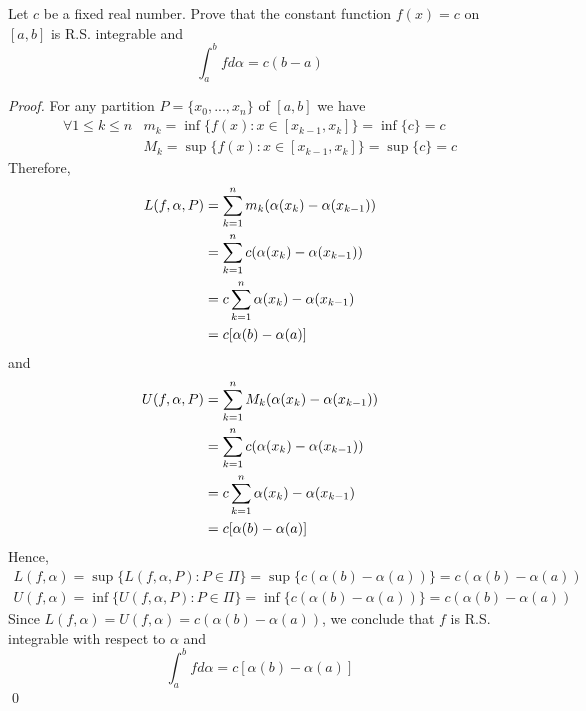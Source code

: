 \begin{example}
    Let $c$ be a fixed real number. Prove that the constant function $f(x) = c$ on $[a,b]$ is R.S. integrable and
    $$
    \int_{a}^{b}f d\alpha = c (b-a)
    $$
\end{example}
\begin{proof}
    For any partition $P = \{x_0, ..., x_n\}$ of $[a,b]$ we have
    \begin{align*}
        \forall 1 \leq k \leq n &m_k = \inf\{f(x) : x \in [x_{k-1}, x_k]\} = \inf \{c\} = c \\
        &M_k = \sup\{f(x) : x \in [x_{k-1}, x_k]\} = \sup \{c\} = c
    \end{align*}
    Therefore,
    \begin{align*}
        L(f, \alpha, P) &= \sum_{k=1}^{n}m_k (\alpha(x_{k})-\alpha(x_{k-1})) \\
        &= \sum_{k=1}^{n}c (\alpha(x_{k})-\alpha(x_{k-1})) \\
        &= c \sum_{k=1}^{n} \alpha(x_{k})-\alpha(x_{k-1}) \\
        &= c [\alpha(b) - \alpha(a)]
    \end{align*}
    and
    \begin{align*}
        U(f, \alpha, P) &= \sum_{k=1}^{n}M_k (\alpha(x_{k})-\alpha(x_{k-1})) \\
        &= \sum_{k=1}^{n}c (\alpha(x_{k})-\alpha(x_{k-1})) \\
        &= c \sum_{k=1}^{n} \alpha(x_{k})-\alpha(x_{k-1}) \\
        &= c [\alpha(b) - \alpha(a)]
    \end{align*}
    Hence,
    \begin{align*}
        L(f, \alpha) = \sup \{L(f, \alpha, P) : P \in \Pi\} = \sup \{c (\alpha(b) - \alpha(a))\} = c(\alpha(b) - \alpha(a)) \\
        U(f, \alpha) = \inf \{U(f, \alpha, P) : P \in \Pi\} = \inf \{c(\alpha(b) - \alpha(a))\} = c(\alpha(b) - \alpha(a))
    \end{align*}
    Since $L(f, \alpha) = U(f, \alpha) = c(\alpha(b) - \alpha(a))$, we conclude that $f$ is R.S. integrable with respect to $\alpha$ and 
    $$
    \int_{a}^{b} f d\alpha = c[\alpha(b) - \alpha(a)]
    $$
    \qed
\end{proof}

